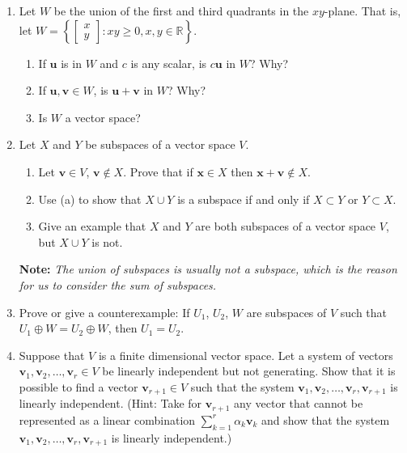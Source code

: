\documentclass[a4paper,11pt]{article}
\begin{document}
\begin{enumerate}
\begin{enumerate}
\begin{enumerate}
  \end{enumerate}
  \end{enumerate}
  \item Let $W$ be the union of the first and third quadrants in the $xy$-plane. That is, let $W = \left\{ \begin{bmatrix}
x \\ y \end{bmatrix}:xy\ge 0,x,y\in\mathbb{R} \right\}$.
  \begin{enumerate}
    \item If $\mathbf{u}$ is in $W$ and $c$ is any scalar, is $c\mathbf{u}$ in $W$? Why?
    \item If $\mathbf{u},\mathbf{v}\in W$, is $\mathbf{u}+\mathbf{v}$ in $W$? Why?
    \item Is $W$ a vector space?
  \end{enumerate}
  \newpage
  \item Let $X$ and $Y$ be subspaces of a vector space $V$. 
  \begin{enumerate}
    \item Let $\mathbf{v} \in V$, $\mathbf{v} \notin X$. Prove that if $\mathbf{x} \in X$ then $\mathbf{x} + \mathbf{v} \notin X$.
    \item Use (a) to show that $X\cup Y$ is a subspace if and only if $X \subset Y$ or $Y \subset X$.
    \item Give an example that  $X$ and $Y$ are both subspaces of a vector space $V$, but $X\cup Y$ is not. 
  \end{enumerate}
  \textbf{Note: }\textit{The union of subspaces is usually not a subspace, which is the reason for us to consider the sum of subspaces.}
  \vspace{12cm}
  \item Prove or give a counterexample: If $U_1$, $U_2$, $W$ are subspaces of $V$ such that $U_1\oplus W=U_2\oplus W$, then $U_1=U_2$.
  \newpage
  \item Suppose that $V$ is a finite dimensional vector space. Let a system of vectors $\mathbf{v}_{1},\mathbf{v}_{2},\ldots,\mathbf{v}_{r}\in V$ be linearly independent but not generating. Show that it is possible to find a vector $\mathbf{v}_{r+1}\in V$ such that the system $\mathbf{v}_{1},\mathbf{v}_{2},\ldots,\mathbf{v}_{r},\mathbf{v}_{r+1}$ is linearly independent. (Hint: Take for $\mathbf{v}_{r+1}$ any vector that
cannot be represented as a linear combination $\sum_{k=1}^r\alpha_k\mathbf{v}_k$ and show that the system $\mathbf{v}_{1},\mathbf{v}_{2},\ldots,\mathbf{v}_{r},\mathbf{v}_{r+1}$ is linearly independent.)

\end{enumerate}
\end{document}
